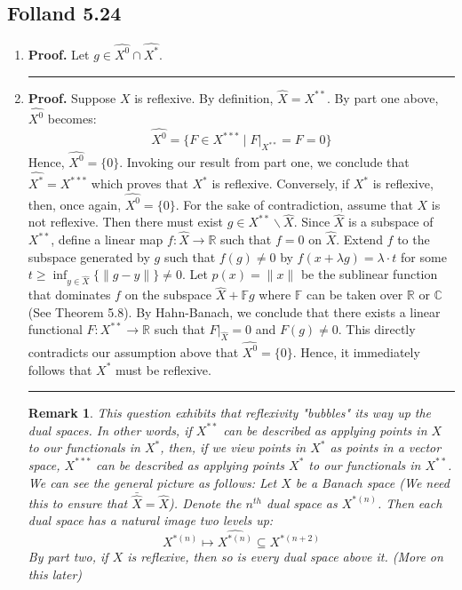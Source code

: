 \documentclass[12pt]{article}%
\newtheorem{remark}[theorem]{Remark}
\newenvironment{proof}[1][Proof]{\textbf{#1.} }{\ \rule{0.5em}{0.5em}}
\newcommand{\R}{\mathbb{R}}
\newcommand{\C}{\mathbb{C}}
\begin{document}
\subsection{Folland 5.24}
\begin{enumerate}
\item
\begin{proof}
Let $g \in \widehat{X^0} \cap \widehat{X^*}$.
\end{proof}
\item
\begin{proof}
Suppose $X$ is reflexive. By definition, $\hat{X} = X^{**}$. By part one above, $\widehat{X^0}$ becomes:
$$ \widehat{X^0} = \{ F \in X^{***} \mid F |_{X^{**}} = F = 0 \}$$ Hence,
$\widehat{X^0} = \{ 0 \}$. Invoking our result from part one, we conclude that $\widehat{X^*} = X^{***}$ which proves that $X^*$ is reflexive. Conversely, if $X^*$ is reflexive, then, once again, $\widehat{X^0} = \{ 0 \}$. For the sake of contradiction, assume that
$X$ is not reflexive. Then there must exist $g \in X^{**} \backslash \hat{X}$. Since $\hat{X}$ is a subspace of $X^{**}$, define a linear map $f: \hat{X} \rightarrow \R$ such that $f = 0$ on $\hat{X}$. Extend $f$ to the subspace generated by $g$ such that $f(g) \neq 0$ by $f(x + \lambda g) = \lambda \cdot t$ for some $t \geq \inf_{y \in \hat{X}} \{ \|g - y\|\} \neq 0$. Let $p(x) = \| x\|$ be the sublinear function that dominates $f$ on the subspace $\hat{X} + \mathbb{F}g$ where $\mathbb{F}$ can be taken over $\R$ or $\C$ (See Theorem 5.8). By Hahn-Banach, we conclude that there exists a linear functional $F: X^{**} \rightarrow \R$ such that $F|_{\hat{X}} = 0$ and $F(g) \neq 0$. This directly contradicts our assumption above that $\widehat{X^0} = \{ 0 \}$. Hence, it immediately follows that $X^*$ must be reflexive.
\end{proof}

\begin{remark}
This question exhibits that reflexivity "bubbles" its way up the dual spaces. In other words, if $X^{**}$ can be described as applying points in $X$ to our functionals  in $X^*$, then, if we view points in $X^*$ as points in a vector space, $X^{***}$ can be described as applying points $X^*$ to our functionals in $X^{**}$. We can see the general picture as follows: Let $X$ be a Banach space (We need this to ensure that $\bar{\hat{X}} = \hat{X}$). Denote the $n^{th}$ dual space as $X^{*(n)}$. Then each dual space has a natural image two levels up:
$$ X^{*(n)} \mapsto \widehat{X^{*(n)}} \subseteq X^{*(n+2)}$$
By part two, if $X$ is reflexive, then so is every dual space above it. (More on this later)
\end{remark}

\end{enumerate}
\end{document}
